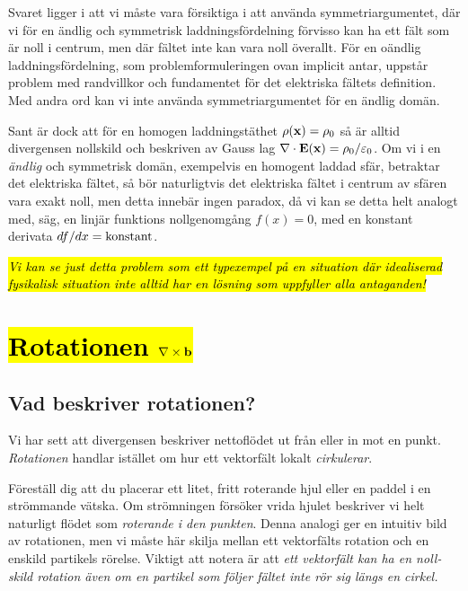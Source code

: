 Svaret ligger i att vi m{\aa}ste vara f{\"o}rsiktiga i att anv{\"a}nda
symmetriargumentet, d{\"a}r vi f{\"o}r en {\"a}ndlig och symmetrisk
laddningsf{\"o}rdelning f{\"o}rvisso kan ha ett f{\"a}lt som {\"a}r noll i
centrum, men d{\"a}r f{\"a}ltet inte kan vara noll {\"o}verallt.
F{\"o}r en o{\"a}ndlig laddningsf{\"o}rdelning, som problemformuleringen ovan
implicit antar, uppst{\aa}r problem med randvillkor och fundamentet f{\"o}r
det elektriska f{\"a}ltets definition. Med andra ord kan vi inte anv{\"a}nda
symmetriargumentet f{\"o}r en {\"a}ndlig dom{\"a}n.

Sant {\"a}r dock att f{\"o}r en homogen laddningst{\"a}thet $\rho({\bf x})=
\rho_0$ s{\aa} {\"a}r alltid divergensen nollskild och beskriven av Gauss lag
$\nabla\cdot{\bf E}({\bf x})=\rho_0/\varepsilon_0$.
Om vi i en {\it {\"a}ndlig} och symmetrisk dom{\"a}n, exempelvis en homogent
laddad sf{\"a}r, betraktar det elektriska f{\"a}ltet, s{\aa} b{\"o}r
naturligtvis det elektriska f{\"a}ltet i centrum av sf{\"a}ren vara exakt noll,
men detta inneb{\"a}r ingen paradox, d{\aa} vi kan se detta helt analogt med,
s{\"a}g, en linj{\"a}r funktions nollgenomg{\aa}ng $f(x)=0$, med en konstant
derivata $df/dx=\hbox{konstant}$.

{\hl{\it Vi kan se just detta problem som ett typexempel p{\aa} en situation
d{\"a}r idealiserad fysikalisk situation inte alltid har en l{\"o}sning
som uppfyller alla antaganden!}}

\section{{\hl{Rotationen $\nabla\times{\bf b}$}}}
\subsection{Vad beskriver rotationen?}
Vi har sett att divergensen beskriver nettofl{\"o}det ut fr{\aa}n eller in mot
en punkt. {\it Rotationen} handlar ist{\"a}llet om hur ett vektorf{\"a}lt
lokalt {\it cirkulerar}.

F{\"o}rest{\"a}ll dig att du placerar ett litet, fritt roterande hjul eller en
paddel i en str{\"o}mmande v{\"a}tska. Om str{\"o}mningen f{\"o}rs{\"o}ker
vrida hjulet beskriver vi helt naturligt fl{\"o}det som {\it roterande i den
punkten}.
Denna analogi ger en intuitiv bild av rotationen, men vi m{\aa}ste h{\"a}r
skilja mellan ett vektorf{\"a}lts rotation och en enskild partikels r{\"o}relse.
Viktigt att notera {\"a}r att {\it ett vektorf{\"a}lt kan ha en noll-skild
rotation {\"a}ven om en partikel som f{\"o}ljer f{\"a}ltet inte r{\"o}r sig
l{\"a}ngs en cirkel.}

